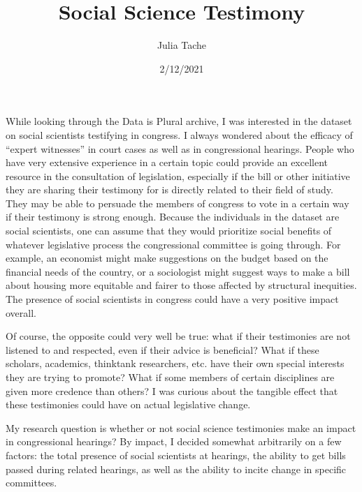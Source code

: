 \documentclass[]{article}
\title{Social Science Testimony}
\author{Julia Tache}
\date{2/12/2021}
\begin{document}
\maketitle

While looking through the Data is Plural archive, I was interested in
the dataset on social scientists testifying in congress. I always
wondered about the efficacy of ``expert witnesses'' in court cases as
well as in congressional hearings. People who have very extensive
experience in a certain topic could provide an excellent resource in the
consultation of legislation, especially if the bill or other initiative
they are sharing their testimony for is directly related to their field
of study. They may be able to persuade the members of congress to vote
in a certain way if their testimony is strong enough. Because the
individuals in the dataset are social scientists, one can assume that
they would prioritize social benefits of whatever legislative process
the congressional committee is going through. For example, an economist
might make suggestions on the budget based on the financial needs of the
country, or a sociologist might suggest ways to make a bill about
housing more equitable and fairer to those affected by structural
inequities. The presence of social scientists in congress could have a
very positive impact overall.

Of course, the opposite could very well be true: what if their
testimonies are not listened to and respected, even if their advice is
beneficial? What if these scholars, academics, thinktank researchers,
etc. have their own special interests they are trying to promote? What
if some members of certain disciplines are given more credence than
others? I was curious about the tangible effect that these testimonies
could have on actual legislative change.

My research question is whether or not social science testimonies make
an impact in congressional hearings? By impact, I decided somewhat
arbitrarily on a few factors: the total presence of social scientists at
hearings, the ability to get bills passed during related hearings, as
well as the ability to incite change in specific committees.
\end{document}
